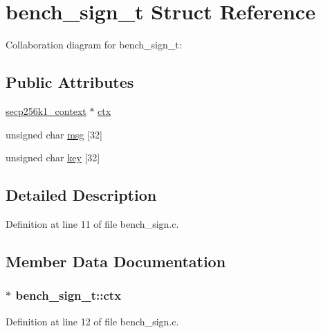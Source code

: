 \hypertarget{structbench__sign__t}{}\section{bench\+\_\+sign\+\_\+t Struct Reference}
\label{structbench__sign__t}


Collaboration diagram for bench\+\_\+sign\+\_\+t\+:
\subsection*{Public Attributes}
\begin{DoxyCompactItemize}
\item 
\hyperlink{secp256k1_8h_a282ec9e6dfec8c35955c3eb2f7476e5e}{secp256k1\+\_\+context} $\ast$ \hyperlink{structbench__sign__t_ae16684ae6cff7c19bf558e5a0204b9ea}{ctx}
\item 
unsigned char \hyperlink{structbench__sign__t_a8710d756cc35409f8c230a89b9a52f71}{msg} \mbox{[}32\mbox{]}
\item 
unsigned char \hyperlink{structbench__sign__t_ae58b8838304b713a59437d4ec87b15d8}{key} \mbox{[}32\mbox{]}
\end{DoxyCompactItemize}


\subsection{Detailed Description}


Definition at line 11 of file bench\+\_\+sign.\+c.



\subsection{Member Data Documentation}
\hypertarget{structbench__sign__t_ae16684ae6cff7c19bf558e5a0204b9ea}{}
\subsubsection[{ctx}]{$\ast$ bench\+\_\+sign\+\_\+t\+::ctx}\label{structbench__sign__t_ae16684ae6cff7c19bf558e5a0204b9ea}


Definition at line 12 of file bench\+\_\+sign.\+c.

\hypertarget{structbench__sign__t_ae58b8838304b713a59437d4ec87b15d8}{}
